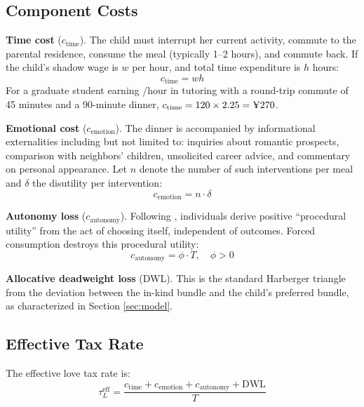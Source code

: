 \documentclass[AER]{AEA}
\begin{document}
\subsection{Component Costs}

\textbf{Time cost} ($c_{\text{time}}$). The child must interrupt her current activity, commute to the parental residence, consume the meal (typically 1--2 hours), and commute back. If the child's shadow wage is $w$ per hour, and total time expenditure is $h$ hours:
\begin{equation}
c_{\text{time}} = wh
\end{equation}
For a graduate student earning /hour in tutoring with a round-trip commute of 45 minutes and a 90-minute dinner, $c_{\text{time}} = 120 \times 2.25 = \text{\textyen} 270$.

\textbf{Emotional cost} ($c_{\text{emotion}}$). The dinner is accompanied by informational externalities including but not limited to: inquiries about romantic prospects, comparison with neighbors' children, unsolicited career advice, and commentary on personal appearance. Let $n$ denote the number of such interventions per meal and $\delta$ the disutility per intervention:
\begin{equation}
c_{\text{emotion}} = n \cdot \delta
\end{equation}

\textbf{Autonomy loss} ($c_{\text{autonomy}}$). Following \citet{frey2004}, individuals derive positive ``procedural utility'' from the act of choosing itself, independent of outcomes. Forced consumption destroys this procedural utility:
\begin{equation}
c_{\text{autonomy}} = \phi \cdot T, \quad \phi > 0
\end{equation}

\textbf{Allocative deadweight loss} (DWL). This is the standard Harberger triangle from the deviation between the in-kind bundle and the child's preferred bundle, as characterized in Section \ref{sec:model}.

\subsection{Effective Tax Rate}

The effective love tax rate is:
\begin{equation}
\tau_L^{\text{eff}} = \frac{c_{\text{time}} + c_{\text{emotion}} + c_{\text{autonomy}} + \text{DWL}}{T}
\end{equation}
\end{document}
